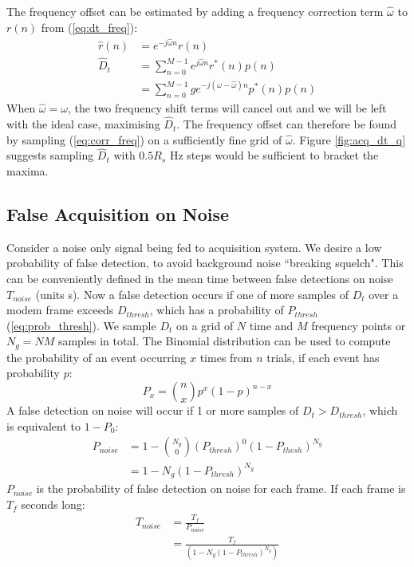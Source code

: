 \documentclass{article}
\begin{document}
The frequency offset can be estimated by adding a frequency correction term $\hat{\omega}$ to $r(n)$ from (\ref{eq:dt_freq}):
\begin{equation}
\begin{split}
\label{eq:corr_freq}
\hat{r}(n) &= e^{-j \hat{\omega} n}r(n) \\
\hat{D}_t &= \sum_{n=0}^{M-1} e^{j \hat{\omega} n} r^*(n) p(n) \\
    &= \sum_{n=0}^{M-1} g e^{-j (\omega - \hat{\omega} ) n} p^*(n)p(n) 
\end{split}
\end{equation}
When $\hat{\omega} = \omega$, the two frequency shift terms will cancel out and we will be left with the ideal  case, maximising $\hat{D}_t$. The frequency offset can therefore be found by sampling (\ref{eq:corr_freq}) on a sufficiently fine grid of $\hat{\omega}$.  Figure \ref{fig:acq_dt_q} suggests sampling $\hat{D}_t$ with $0.5R_s$ Hz steps would be sufficient to bracket the maxima.  

\subsection{False Acquisition on Noise}

Consider a noise only signal being fed to acquisition system.  We desire a low probability of false detection, to avoid background noise ``breaking squelch".  This can be conveniently defined in the mean time between false detections on noise $T_{noise}$ (units s).  Now a false detection occurs if one of more samples of $D_t$ over a modem frame exceeds $D_{thresh}$, which has a probability of $P_{thresh}$ (\ref{eq:prob_thresh}).  We sample $D_t$ on a grid of $N$ time and $M$ frequency points or $N_g=NM$ samples in total. The Binomial distribution can be used to compute the probability of an event occurring $x$ times from $n$ trials, if each event has probability $p$:
\begin{equation}
P_x = {n \choose x} p^x (1-p)^{n-x}
\end{equation}
A false detection on noise will occur if 1 or more samples of $D_t>D_{thresh}$, which is equivalent to $1-P_0$:
\begin{equation}
\label{eq:Pnoise_theory}
\begin{split}
P_{noise} &= 1 - {N_g \choose 0} (P_{thresh})^0 (1-P_{thesh})^{N_g} \\
    &= 1 - N_g(1 - P_{thresh})^{N_g}
\end{split}
\end{equation}
$P_{noise}$ is the probability of false detection on noise for each frame.  If each frame is $T_f$ seconds long:
\begin{equation}
\label{eq:t_false_noise}
\begin{split}
T_{noise} &= \frac{T_f}{P_{noise}} \\
   &= \frac{T_f}{(1 - N_g(1-P_{thresh})^{N_g})}
\end{split}
\end{equation}
\end{document}
